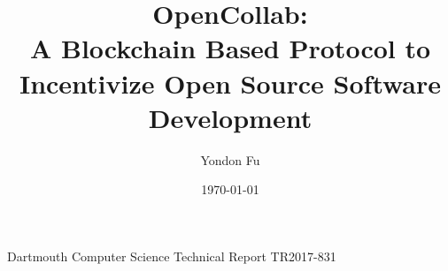 \documentclass[12pt]{article}
\begin{document}
\title{
  {OpenCollab:}\\
  {A Blockchain Based Protocol to Incentivize Open Source Software
    Development}
}
\author{Yondon Fu}
\date{\today}


\begin{titlepage}
  \clearpage\maketitle
  \thispagestyle{empty}
  \vfill
  {\centering Dartmouth Computer Science Technical Report TR2017-831\par}
\end{titlepage}










\printbibliography
\end{document}
